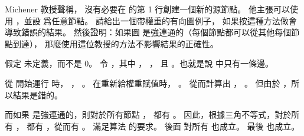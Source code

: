 \startEXERCISE
Michener 教授聲稱，
沒有必要在  的第 1 行創建一個新的源節點。
他主張可以使用 ，並設  爲任意節點。
請給出一個帶權重的有向圖例子，
如果按這種方法做會導致錯誤的結果。
然後證明：如果圖  是強連通的（每個節點都可以從其他每個節點到達），
那麼使用這位教授的方法不影響結果的正確性。
\stopEXERCISE

\startANSWER
假定 \m{\infty-\infty} 未定義，而不是 0。
令 ，其中 ， ，
且 。也就是說  中只有一條邊。

從  開始運行  時，
 ， 。
在重新給權重賦值時， 。
從而計算出 ， 。
但由於 ，所以結果是錯的。

而如果  是強連通的，則對於所有節點 ，
都有 。
因此，根據三角不等式，對於所有 ，
都有 ，從而有 。
滿足算法  的要求。
後面  對所有  也成立。
最後  也成立。
\stopANSWER

\stopsection

